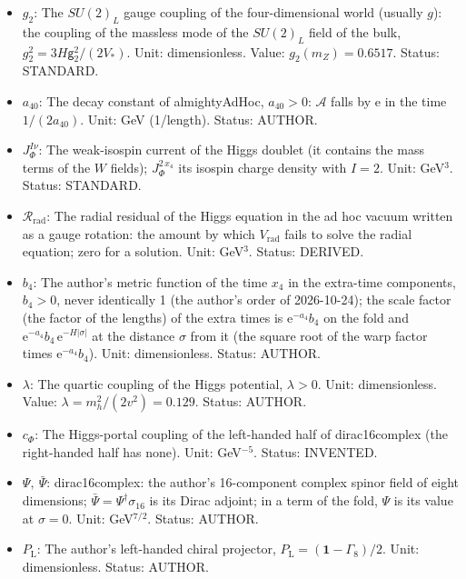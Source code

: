 \documentclass[
  10pt,
]{article}
\begin{document}
\begin{itemize}
\item
  \(g_2\): The \(SU(2)_L\) gauge coupling of the four-dimensional world
  (usually \(g\)): the coupling of the massless mode of the \(SU(2)_L\)
  field of the bulk, \(g_2^2 = 3H\mathsf{g}_2^2/(2V_*)\). Unit:
  dimensionless. Value: \(g_2(m_Z) = 0.6517\). Status: STANDARD.
\item
  \(a_{40}\): The decay constant of almightyAdHoc, \(a_{40} > 0\):
  \(\mathcal{A}\) falls by \(\mathrm{e}\) in the time \(1/(2a_{40})\).
  Unit: GeV (1/length). Status: AUTHOR.
\item
  \(J_\Phi^{I\nu}\): The weak-isospin current of the Higgs doublet (it
  contains the mass terms of the \(W\) fields); \(J_\Phi^{2\,x_4}\) its
  isospin charge density with \(I = 2\). Unit: GeV\(^3\). Status:
  STANDARD.
\item
  \(\mathcal{R}_{\mathrm{rad}}\): The radial residual of the Higgs
  equation in the ad hoc vacuum written as a gauge rotation: the amount
  by which \(V_{\mathrm{rad}}\) fails to solve the radial equation; zero
  for a solution. Unit: GeV\(^3\). Status: DERIVED.
\item
  \(b_4\): The author's metric function of the time \(x_4\) in the
  extra-time components, \(b_4 > 0\), never identically 1 (the author's
  order of 2026-10-24); the scale factor (the factor of the lengths) of
  the extra times is \(\mathrm{e}^{-a_4}b_4\) on the fold and
  \(\mathrm{e}^{-a_4}b_4\,\mathrm{e}^{-H\lvert\sigma\rvert}\) at the
  distance \(\sigma\) from it (the square root of the warp factor times
  \(\mathrm{e}^{-a_4}b_4\)). Unit: dimensionless. Status: AUTHOR.
\item
  \(\lambda\): The quartic coupling of the Higgs potential,
  \(\lambda > 0\). Unit: dimensionless. Value:
  \(\lambda = m_h^2/(2v^2) = 0.129\). Status: AUTHOR.
\item
  \(c_\Phi\): The Higgs-portal coupling of the left-handed half of
  dirac16complex (the right-handed half has none). Unit: GeV\(^{-5}\).
  Status: INVENTED.
\item
  \(\Psi,\ \bar\Psi\): dirac16complex: the author's 16-component complex
  spinor field of eight dimensions;
  \(\bar\Psi = \Psi^\dagger\sigma_{16}\) is its Dirac adjoint; in a term
  of the fold, \(\Psi\) is its value at \(\sigma = 0\). Unit:
  GeV\(^{7/2}\). Status: AUTHOR.
\item
  \(P_{\mathrm{L}}\): The author's left-handed chiral projector,
  \(P_{\mathrm{L}} = (\mathbf{1} - \Gamma_8)/2\). Unit: dimensionless.
  Status: AUTHOR.
\end{itemize}
\end{document}
